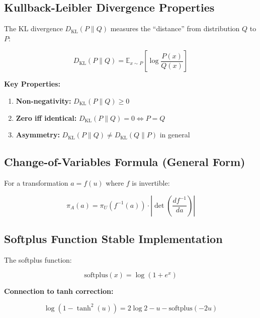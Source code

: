 \documentclass[12pt,a4paper]{article}
\theoremstyle{noteplain}
\theoremstyle{noteexercise}
\begin{document}
\subsection{Kullback-Leibler Divergence Properties}\label{ssec:kl-prop}



The KL divergence $D_{\text{KL}}(P \| Q)$ measures the ``distance'' from distribution $Q$ to $P$:

$$D_{\text{KL}}(P \| Q) = \mathbb{E}_{x \sim P}\left[\log\frac{P(x)}{Q(x)}\right]$$

\textbf{Key Properties:}

\begin{enumerate}
  \setlength{\itemsep}{0.2em}
  \item \textbf{Non-negativity:} $D_{\text{KL}}(P \| Q) \geq 0$
  \item \textbf{Zero iff identical:} $D_{\text{KL}}(P \| Q) = 0 \iff P = Q$
  \item \textbf{Asymmetry:} $D_{\text{KL}}(P \| Q) \neq D_{\text{KL}}(Q \| P)$ in general
\end{enumerate}



\subsection{Change-of-Variables Formula (General Form)}\label{ssec:cov-general}



For a transformation $a = f(u)$ where $f$ is invertible:

$$\pi_A(a) = \pi_U(f^{-1}(a)) \cdot \left|\det\left(\frac{d f^{-1}}{da}\right)\right|$$



\subsection{Softplus Function Stable Implementation}\label{ssec:softplus}



The softplus function:

$$\text{softplus}(x) = \log(1 + e^x)$$

\textbf{Connection to tanh correction:}

$$\log(1 - \tanh^2(u)) = 2\log 2 - u - \text{softplus}(-2u)$$



\end{document}
